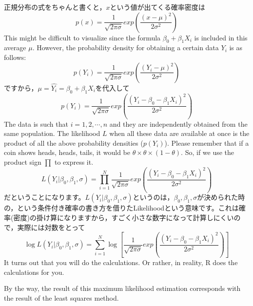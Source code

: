 \documentclass{ltjsarticle}
\begin{document}
正規分布の式をちゃんと書くと，$x$という値が出てくる確率密度は
\[ p(x) = \frac{1}{\sqrt{2\pi \sigma}}exp\left( \frac{(x-\mu)^2}{2\sigma^2}\right)\]
This might be difficult to visualize since the formula $\beta_0 + \beta_1 X_i$ is included in this average $\mu$. However, the probability density for obtaining a certain data $Y_i$ is as follows:
\[ p(Y_i) = \frac{1}{\sqrt{2\pi \sigma}}exp\left( \frac{(Y_i-\mu)^2}{2\sigma^2}\right)\]
ですから，$\mu=\hat{Y_i} = \beta_0 + \beta_1 X_i$を代入して
\[ p(Y_i) = \frac{1}{\sqrt{2\pi \sigma}}exp\left( \frac{(Y_i-\beta_0 - \beta_1 X_i)^2}{2\sigma^2}\right)\]
The data is such that $i = 1,2,\cdots,n$ and they are independently obtained from the same population. The likelihood $L$ when all these data are available at once is the product of all the above probability densities ($p(Y_i)$). Please remember that if a coin shows heads, heads, tails, it would be $\theta \times \theta \times (1-\theta)$. So, if we use the product sign $\prod$ to express it.
\[ L(Y_i | \beta_0,\beta_1,\sigma) = \prod_{i=1}^N \frac{1}{\sqrt{2\pi \sigma}}exp\left( \frac{(Y_i-\beta_0 - \beta_1 X_i)^2}{2\sigma^2}\right)\]
だということになります。$L(Y_i | \beta_0,\beta_1,\sigma) $というのは，$\beta_0,\beta_1,\sigma$が決められた時の，という条件付き確率の書き方を借りたLikelihoodという意味です。これは確率(密度)の掛け算になりますから，すごく小さな数字になって計算しにくいので，実際には対数をとって
\[ \log L(Y_i | \beta_0,\beta_1,\sigma) = \sum_{i=1}^N \log \left[ \frac{1}{\sqrt{2\pi \sigma}}exp\left( \frac{(Y_i-\beta_0 - \beta_1 X_i)^2}{2\sigma^2}\right)\right]\]
It turns out that you will do the calculations. Or rather, in reality, R does the calculations for you.

By the way, the result of this maximum likelihood estimation corresponds with the result of the least squares method.
\end{document}
